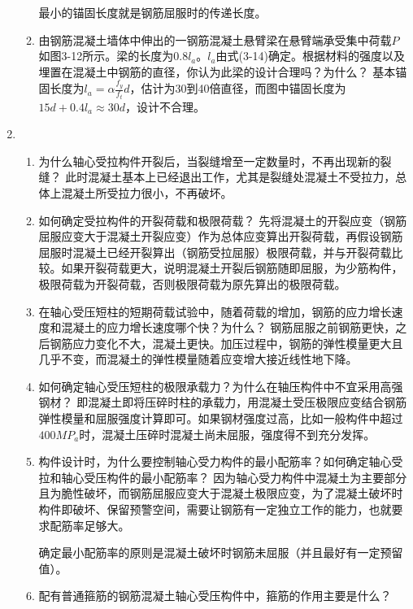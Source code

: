 \documentclass{article}
\begin{document}
\begin{enumerate}
\begin{enumerate}[1.]
                        \par 最小的锚固长度就是钢筋屈服时的传递长度。
                  \item 由钢筋混凝土墙体中伸出的一钢筋混凝土悬臂梁在悬臂端承受集中荷载$P$如图3-12所示。梁的长度为$0.8l_a$。$l_a$由式(3-14)确定。根据材料的强度以及埋置在混凝土中钢筋的直径，你认为此梁的设计合理吗？为什么？
                        \ans 基本锚固长度为$l_a=\alpha\frac{f_y}{f_t}d$，估计为30到40倍直径，而图中锚固长度为$15d+0.4l_a\approx30d$，设计不合理。
            \end{enumerate}
      \item \begin{enumerate}[1.]
                  \item 为什么轴心受拉构件开裂后，当裂缝增至一定数量时，不再出现新的裂缝？
                        \ans 此时混凝土基本上已经退出工作，尤其是裂缝处混凝土不受拉力，总体上混凝土所受拉力很小，不再破坏。
                  \item 如何确定受拉构件的开裂荷载和极限荷载？
                        \ans 先将混凝土的开裂应变（钢筋屈服应变大于混凝土开裂应变）作为总体应变算出开裂荷载，再假设钢筋屈服时混凝土已经开裂算出（钢筋受拉屈服）极限荷载，并与开裂荷载比较。如果开裂荷载更大，说明混凝土开裂后钢筋随即屈服，为少筋构件，极限荷载为开裂荷载，否则极限荷载为原先算出的极限荷载。
                  \item 在轴心受压短柱的短期荷载试验中，随着荷载的增加，钢筋的应力增长速度和混凝土的应力增长速度哪个快？为什么？
                        \ans 钢筋屈服之前钢筋更快，之后钢筋应力变化不大，混凝土更快。加压过程中，钢筋的弹性模量更大且几乎不变，而混凝土的弹性模量随着应变增大接近线性地下降。
                  \item 如何确定轴心受压短柱的极限承载力？为什么在轴压构件中不宜采用高强钢材？
                        \ans 即混凝土即将压碎时柱的承载力，用混凝土受压极限应变结合钢筋弹性模量和屈服强度计算即可。如果钢材强度过高，比如一般构件中超过$400MP_a$时，混凝土压碎时混凝土尚未屈服，强度得不到充分发挥。
                  \item 构件设计时，为什么要控制轴心受力构件的最小配筋率？如何确定轴心受拉和轴心受压构件的最小配筋率？
                        \ans 因为轴心受力构件中混凝土为主要部分且为脆性破坏，而钢筋屈服应变大于混凝土极限应变，为了混凝土破坏时构件即破坏、保留预警空间，需要让钢筋有一定独立工作的能力，也就要求配筋率足够大。
                        \par 确定最小配筋率的原则是混凝土破坏时钢筋未屈服（并且最好有一定预留值）。
                  \item 配有普通箍筋的钢筋混凝土轴心受压构件中，箍筋的作用主要是什么？

\end{enumerate}
\end{enumerate}
\end{document}
